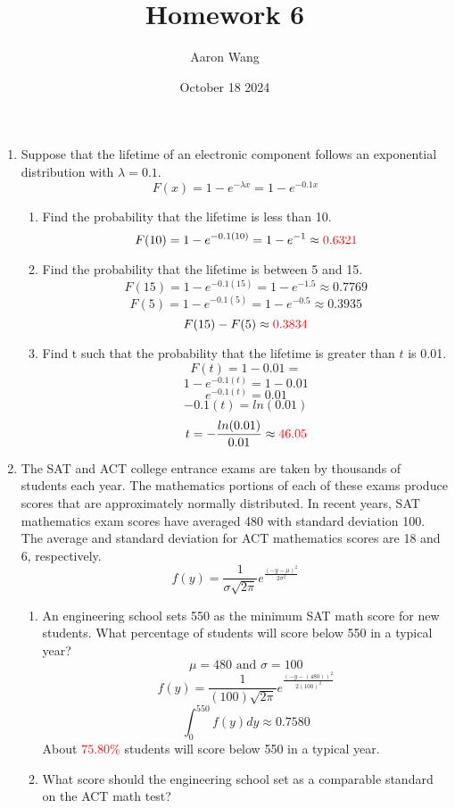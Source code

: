 \documentclass{article}
\title{Homework 6}
\author{Aaron Wang}
\date{October 18 2024}
\begin{document}
\maketitle
\begin{enumerate}
    \item Suppose that the lifetime of an electronic component follows an exponential distribution with $\lambda = 0.1$.
    \[
        F(x)=1-e^{-\lambda x}=1-e^{-0.1x}
    \]
    \begin{enumerate}
        \item Find the probability that the lifetime is less than 10.
        \[F(10)=1-e^{-0.1(10)}=1-e^{-1} \approx \textcolor{red}{0.6321}\]
        \item Find the probability that the lifetime is between 5 and 15.
        \[F(15)=1-e^{-0.1(15)}=1-e^{-1.5} \approx 0.7769\]
        \[F(5)=1-e^{-0.1(5)}=1-e^{-0.5} \approx 0.3935\]
        \[F(15)-F(5) \approx \textcolor{red}{0.3834}\]
        \item Find t such that the probability that the lifetime is greater than $t$ is 0.01.
        \[F(t)=1-0.01=\]
        \[1-e^{-0.1(t)}=1-0.01\]
        \[e^{-0.1(t)}=0.01\]
        \[-0.1(t)=ln(0.01)\]
        \[t=-\frac{ln(0.01)}{0.01} \approx \textcolor{red}{46.05}\]
    \end{enumerate}
\pagebreak
    \item The SAT and ACT college entrance exams are taken by thousands of students each year. The mathematics portions of each of these exams produce scores that are approximately normally distributed. In recent years, SAT mathematics exam scores have averaged 480 with standard deviation 100. The average and standard deviation for ACT mathematics scores are 18 and 6, respectively.
    \[
        f(y)=\frac{1}{\sigma \sqrt{2\pi}}e^{\frac{(-y-\mu)^2}{2 \sigma^2}}
    \]
    \begin{enumerate}
        \item An engineering school sets 550 as the minimum SAT math score for new students. What percentage of students will score below 550 in a typical year?
        \[
            \mu = 480 \text{ and } \sigma = 100
        \]
        \[
            f(y)=\frac{1}{(100) \sqrt{2\pi}}e^{\frac{(-y-(480))^2}{2 (100)^2}}
        \]
        \[\int_{0}^{550}f(y)dy\approx 0.7580\]
        About \textcolor{red}{$75.80\%$} students will score below 550 in a typical year.
        \item What score should the engineering school set as a comparable standard on the ACT math test?
        \[
\]
\end{enumerate}
\end{enumerate}
\end{document}
